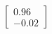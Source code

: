 \documentclass[preview]{standalone}
\begin{document}
\begin{align*}
\begin{bmatrix} 0.96 \\ -0.02 \end{bmatrix}
\end{align*}
\end{document}

